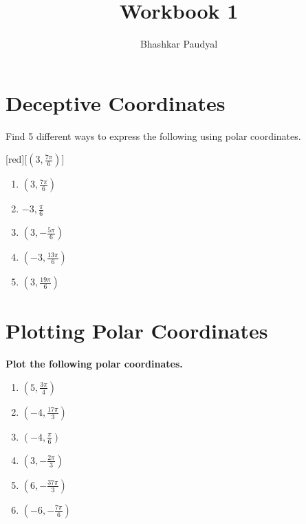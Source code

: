 \documentclass[a4paper]{article}
\author{Bhashkar Paudyal}
\title{Workbook 1}
\begin{document}
  \maketitle
  \newpage

  \tableofcontents{}
  \newpage

  \section{Deceptive Coordinates}
  \label{sec:deceptive-coordinates}

  \begin{problem}{Find 5 different ways to express the following using polar
    coordinates.\\}
    \begin{polargrid}[5][5][24][5.5]
      [red][\((3,\frac{7\pi}{6})\)]
    \end{polargrid}
    \begin{solution}
      \begin{enumerate}
        \item \((3,\frac{7\pi}{6})\)
        \item \(-3,\frac{\pi}{6}\) 
        \item \((3,-\frac{5\pi}{6})\) 
        \item \((-3,\frac{13\pi}{6})\) 
        \item \((3, \frac{19\pi}{6})\)
      \end{enumerate}
    \end{solution}
  \end{problem}

  \newpage

  \section{Plotting Polar Coordinates}
  \label{sec:plotting-polar-coordinates}

  \textbf{Plot the following polar coordinates.\\}
    \begin{enumerate}
      \item \((5,\frac{3\pi}{4})\) 
      \item \((-4,\frac{17\pi}{3})\) 
      \item \((-4,\frac{\pi}{6})\) 
      \item \((3,-\frac{2\pi}{3})\) 
      \item \((6,-\frac{37\pi}{3})\)
      \item \((-6,-\frac{7\pi}{6})\)
    \end{enumerate}
    
\end{document}
